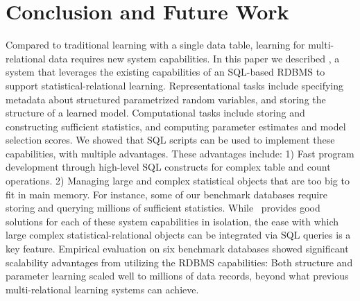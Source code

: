 \section{Conclusion and Future Work} 
Compared to traditional learning with a single data table, learning for multi-relational data requires new system capabilities. In this paper we described \FB, a system that leverages the existing capabilities of an SQL-based RDBMS to support statistical-relational learning.
Representational tasks include specifying metadata about structured parametrized random variables, and storing the structure of a learned model. Computational tasks include storing and constructing sufficient statistics, and computing parameter estimates and model selection scores. 
We showed that SQL scripts can be used to implement these capabilities, with multiple advantages. These advantages include: 1) Fast program development through high-level SQL constructs for complex table and count operations. 2) Managing large and complex statistical objects that are too big to fit in main memory. 
For instance, some of our benchmark databases require storing and querying millions of sufficient statistics. While \FB\ provides good solutions for each of these system capabilities in isolation, the ease with which large complex statistical-relational objects can be integrated via SQL queries is a key feature. 
Empirical evaluation on six benchmark databases showed significant scalability advantages from utilizing the RDBMS capabilities: Both structure and parameter learning scaled well to millions of data records, beyond what previous multi-relational learning systems can achieve. 

